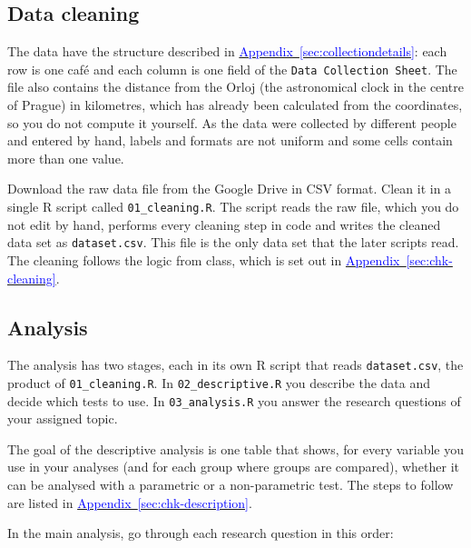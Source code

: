 \documentclass[11pt,a4paper]{article}
\begin{document}
\subsection{Data cleaning}\label{sec:rules}

The data have the structure described in \hyperref[sec:collectiondetails]{\textcolor{blue}{Appendix~\ref*{sec:collectiondetails}}}: each row is one caf\'e and each column is one field of the \texttt{Data Collection Sheet}. The file also contains the distance from the Orloj (the astronomical clock in the centre of Prague) in kilometres, which has already been calculated from the coordinates, so you do not compute it yourself. 
As the data were collected by different people and entered by hand, labels and formats are not uniform and some cells contain more than one value.

Download the raw data file from the Google Drive in CSV format. Clean it in a single R script called \texttt{01\_cleaning.R}. The script reads the raw file, which you do not edit by hand, performs every cleaning step in code and writes the cleaned data set as \texttt{dataset.csv}. This file is the only data set that the later scripts read. The cleaning follows the logic from class, which is set out in \hyperref[sec:chk-cleaning]{\textcolor{blue}{Appendix~\ref*{sec:chk-cleaning}}}.

\subsection{Analysis}\label{sec:general}

The analysis has two stages, each in its own R script that reads \texttt{dataset.csv}, the product of \texttt{01\_cleaning.R}. In \texttt{02\_descriptive.R} you describe the data and decide which tests to use. In \texttt{03\_analysis.R} you answer the research questions of your assigned topic.

The goal of the descriptive analysis is one table that shows, for every variable you use in your analyses (and for each group where groups are compared), whether it can be analysed with a parametric or a non-parametric test. The steps to follow are listed in \hyperref[sec:chk-description]{\textcolor{blue}{Appendix~\ref*{sec:chk-description}}}.

In the main analysis, go through each research question in this order:
\end{document}
